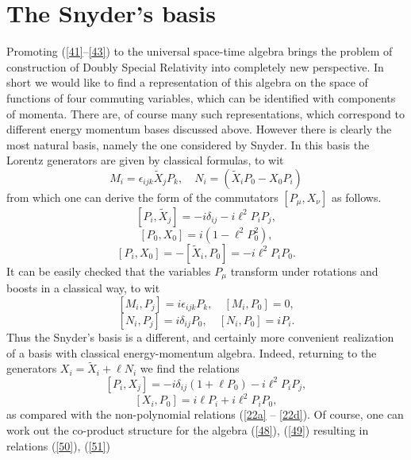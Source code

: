 \documentclass [prd,twocolumn,nofootinbib,showpacs]  {revtex4}
\begin{document}
\section{The Snyder's basis}

Promoting (\ref{41}--\ref{43}) to the  universal space-time
algebra brings the problem of construction of  Doubly Special
Relativity into completely new perspective. In short we would like
to find a representation of this algebra on the space of functions
of four commuting variables, which can be identified with
components of momenta. There are, of course many such
representations, which correspond to different energy momentum
bases discussed above. However there is clearly the most natural
basis, namely the one considered by Snyder. In this basis the
Lorentz generators are given by classical formulas, to wit
\begin{equation}\label{44}
 M_i = \epsilon_{ijk}  \tilde{X}_j P_k , \quad N_i = \left( \tilde{X}_i P_0 - {X}_0 P_i\right)
\end{equation}
from which one can derive the form of the commutators $[P_\mu, X_\nu]$ as follows.
\begin{equation}\label{45}
 [P_i, \tilde{X}_j] = - i \delta_{ij} - i \ell^2 P_i P_j,
\end{equation}
\begin{equation}\label{46}
  [P_0, X_0] = i\left(1 - \ell^2 P_0^2\right),
\end{equation}
\begin{equation}\label{47}
 [P_i, X_0] = -[\tilde{X}_i, P_0] = - i \ell^2 P_i P_0.
\end{equation}
It can be easily checked that the variables $P_\mu$ transform under rotations and boosts in a classical way, to wit
\begin{equation}\label{48}
[M_i, P_j]= i\epsilon_{ijk}P_k, \quad [M_i, P_0]=0,
\end{equation}
\begin{equation}\label{49}
  [N_i, P_j]= i \delta_{ij}P_0, \quad [N_i, P_0]=i P_i.
\end{equation}
Thus the Snyder's basis is a different, and certainly more
convenient realization of a basis with classical  energy-momentum
algebra. Indeed, returning to the generators $X_i = \tilde{X}_i +
\ell N_i$ we find the relations
\begin{equation}\label{50}
 [P_i, {X}_j] = - i \delta_{ij}\left(1 + \ell P_0\right) - i \ell^2 P_i P_j,
\end{equation}
\begin{equation}\label{51}
  [{X}_i, P_0] =  i\ell P_i + i \ell^2 P_i P_0,
\end{equation}
as compared with the non-polynomial relations (\ref{22a} --
\ref{22d}). Of course, one can work out the  co-product structure
for the algebra (\ref{48}), (\ref{49}) resulting in relations
(\ref{50}), (\ref{51})
\end{document}
